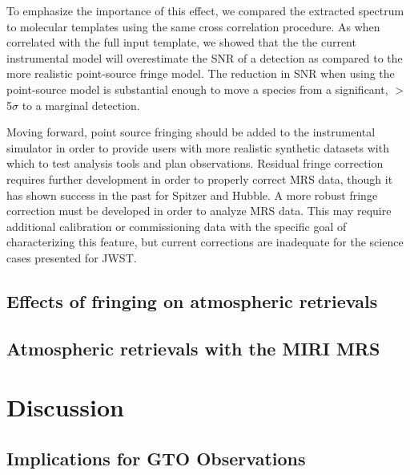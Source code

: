 To emphasize the importance of this effect, we compared the extracted spectrum to molecular templates using the same cross correlation procedure.
As when correlated with the full input template, we showed that the the current instrumental model will overestimate the SNR of a detection as compared to the more realistic point-source fringe model. 
The reduction in SNR when using the point-source model is substantial enough to move a species from a significant, $>$5$\sigma$ to a marginal detection.

Moving forward, point source fringing should be added to the instrumental simulator in order to provide users with more realistic synthetic datasets with which to test analysis tools and plan observations. 
Residual fringe correction requires further development in order to properly correct MRS data, though it has shown success in the past for Spitzer and Hubble.
A more robust fringe correction must be developed in order to analyze MRS data.
This may require additional calibration or commissioning data with the specific goal of characterizing this feature, but current corrections are inadequate for the science cases presented for JWST.

\subsection{Effects of fringing on atmospheric retrievals}
\subsection{Atmospheric retrievals with the MIRI MRS}
\section{Discussion}
\subsection{Implications for GTO Observations}
